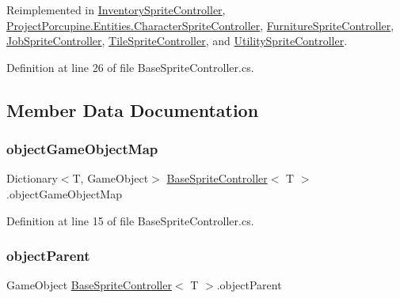 Reimplemented in \hyperlink{class_inventory_sprite_controller_a60aa5f30a8947b7490e99592e0a87da2}{Inventory\+Sprite\+Controller}, \hyperlink{class_project_porcupine_1_1_entities_1_1_character_sprite_controller_acb355f0f1482b7ad05ab8cfe69b92974}{Project\+Porcupine.\+Entities.\+Character\+Sprite\+Controller}, \hyperlink{class_furniture_sprite_controller_aaa9325a8a0357fe3b64709ea437a3dce}{Furniture\+Sprite\+Controller}, \hyperlink{class_job_sprite_controller_ae84f16c980f6376985c0752874dc28a4}{Job\+Sprite\+Controller}, \hyperlink{class_tile_sprite_controller_a1d4cb3a617ce9c1fad7b5f759368bb36}{Tile\+Sprite\+Controller}, and \hyperlink{class_utility_sprite_controller_a3fc765c4cfe8a827e60facd93bc96b62}{Utility\+Sprite\+Controller}.



Definition at line 26 of file Base\+Sprite\+Controller.\+cs.



\subsection{Member Data Documentation}
\mbox{\label{class_base_sprite_controller_a45a85e9a0a75886567d7b987a58a60d9}} 
\subsubsection{\texorpdfstring{object\+Game\+Object\+Map}{objectGameObjectMap}}
{\footnotesize\ttfamily Dictionary$<$T, Game\+Object$>$ \hyperlink{class_base_sprite_controller}{Base\+Sprite\+Controller}$<$ T $>$.object\+Game\+Object\+Map\hspace{0.3cm}{\ttfamily [protected]}}



Definition at line 15 of file Base\+Sprite\+Controller.\+cs.

\mbox{\label{class_base_sprite_controller_a35a1646a05922049ab4e6c8e56209821}} 
\subsubsection{\texorpdfstring{object\+Parent}{objectParent}}
{\footnotesize\ttfamily Game\+Object \hyperlink{class_base_sprite_controller}{Base\+Sprite\+Controller}$<$ T $>$.object\+Parent\hspace{0.3cm}{\ttfamily [protected]}}



